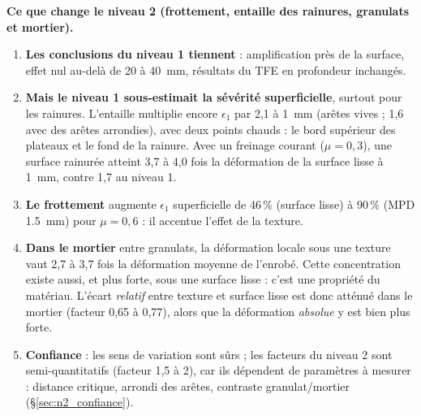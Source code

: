 \begin{encadre}[colframe=orange!70]
\textbf{Ce que change le niveau 2 (frottement, entaille des rainures, granulats et mortier).}
\begin{enumerate}[nosep]
\item \textbf{Les conclusions du niveau 1 tiennent} : amplification près de la surface, effet nul
      au-delà de 20 à \SI{40}{mm}, résultats du TFE en profondeur inchangés.
\item \textbf{Mais le niveau 1 sous-estimait la sévérité superficielle}, surtout pour les
      rainures. L'entaille multiplie encore $\epsilon_1$ par 2,1 à \SI{1}{mm}
      (arêtes vives ; 1,6 avec des arêtes arrondies), avec deux points chauds :
      le bord supérieur des plateaux et le fond de la rainure. Avec un freinage courant ($\mu=0{,}3$), une surface rainurée
      atteint 3,7 à
      4,0 fois la déformation
      de la surface lisse à \SI{1}{mm}, contre 1,7 au niveau 1.
\item \textbf{Le frottement} augmente $\epsilon_1$ superficielle de 46\,\%
      (surface lisse) à 90\,\% (MPD \SI{1.5}{mm})
      pour $\mu=0{,}6$ : il accentue l'effet de la texture.
\item \textbf{Dans le mortier} entre granulats, la déformation locale sous une texture vaut
      2,7 à 3,7 fois la déformation moyenne de l'enrobé.
      Cette concentration existe aussi, et plus forte, sous une surface lisse : c'est une propriété
      du matériau. L'écart \emph{relatif} entre texture et surface lisse est donc atténué dans le
      mortier (facteur 0,65 à 0,77),
      alors que la déformation \emph{absolue} y est bien plus forte.
\item \textbf{Confiance} : les sens de variation sont sûrs ; les facteurs du niveau 2 sont
      semi-quantitatifs (facteur 1,5 à 2), car ils dépendent de paramètres à mesurer : distance
      critique, arrondi des arêtes, contraste granulat/mortier (\S\ref{sec:n2_confiance}).
\end{enumerate}
\end{encadre}
